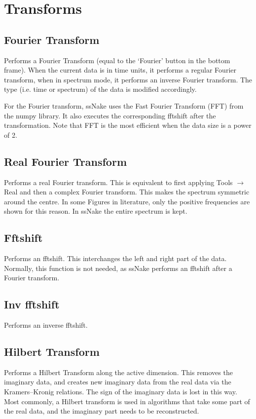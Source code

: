 \documentclass[11pt,a4paper]{article}
\begin{document}
\section{Transforms}
\subsection{Fourier Transform}
Performs a Fourier Transform (equal to the `Fourier' button in the bottom frame).
When the current data is in time units, it performs a regular Fourier transform, when in spectrum mode, it performs an inverse Fourier transform.
The type (i.e. time or spectrum) of the data is modified accordingly.

For the Fourier transform, ssNake uses the Fast Fourier Transform (FFT) from the numpy library.
It also executes the corresponding fftshift after the transformation.
Note that FFT is the most efficient when the data size is a power of 2.


\subsection{Real Fourier Transform}
Performs a real Fourier transform.
This is equivalent to first applying Tools $\rightarrow$ Real and then a complex Fourier transform.
This makes the spectrum symmetric around the centre.
In some Figures in literature, only the positive frequencies are shown for this reason.
In ssNake the entire spectrum is kept.

\subsection{Fftshift}
Performs an fftshift. This interchanges the left and right part of the data.
Normally, this function is not needed, as ssNake performs an fftshift after a Fourier transform.

\subsection{Inv fftshift}
Performs an inverse fftshift.


\subsection{Hilbert Transform}
Performs a Hilbert Transform along the active dimension.
This removes the imaginary data, and creates new imaginary data from the real data via the Kramers--Kronig relations.
The sign of the imaginary data is lost in this way.
Most commonly, a Hilbert transform is used in algorithms that take some part of the real data, and the imaginary part needs to be reconstructed.
\end{document}
